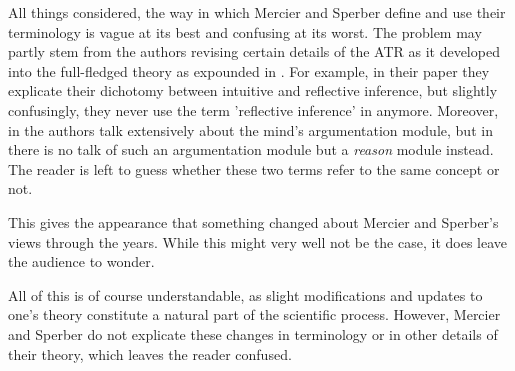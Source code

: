 
All things considered, the way in which Mercier and Sperber define and use their terminology is vague at its best and confusing at its worst. The problem may partly stem from the authors revising certain details of the ATR as it developed into the full-fledged theory as expounded in \citet{MS17}.
For example, in their \citeyear{MS09} paper they explicate their dichotomy between intuitive and reflective inference, but slightly confusingly, they never use the term 'reflective inference' in \citet{MS11} anymore.
Moreover, in \citet{MS09} the authors talk extensively about the mind's argumentation module, but in \citet{MS17} there is no talk of such an argumentation module but a \emph{reason} module instead. The reader is left to guess whether these two terms refer to the same concept or not.

This gives the appearance that something changed about Mercier and Sperber's views through the years.
While this might very well not be the case, it does leave the audience to wonder.

All of this is of course understandable, as slight modifications and updates to one's theory constitute a natural part of the scientific process. However, Mercier and Sperber do not explicate these changes in terminology or in other details of their theory, which leaves the reader confused.

